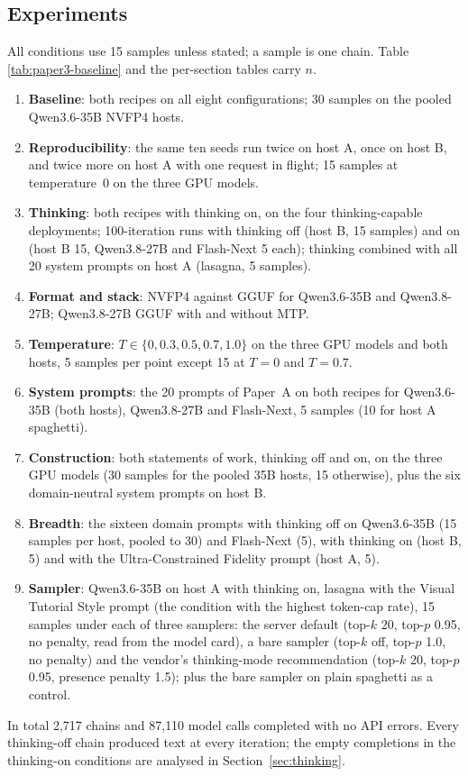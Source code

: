 \documentclass[11pt]{article}
\begin{document}
\subsection{Experiments}
\label{sec:design}

All conditions use 15 samples unless stated; a sample is one chain. Table
\ref{tab:paper3-baseline} and the per-section tables carry $n$.
\begin{enumerate}[leftmargin=*]
  \item \textbf{Baseline}: both recipes on all eight configurations; 30
        samples on the pooled Qwen3.6-35B NVFP4 hosts.
  \item \textbf{Reproducibility}: the same ten seeds run twice on host A,
        once on host B, and twice more on host A with one request in
        flight; 15 samples at temperature~0 on the three GPU models.
  \item \textbf{Thinking}: both recipes with thinking on, on the four
        thinking-capable deployments; 100-iteration runs with thinking off
        (host B, 15 samples) and on (host B 15, Qwen3.8-27B and Flash-Next
        5 each); thinking combined with all 20 system prompts on host A
        (lasagna, 5 samples).
  \item \textbf{Format and stack}: NVFP4 against GGUF for Qwen3.6-35B and
        Qwen3.8-27B; Qwen3.8-27B GGUF with and without MTP.
  \item \textbf{Temperature}: $T\in\{0,0.3,0.5,0.7,1.0\}$ on the three GPU
        models and both hosts, 5 samples per point except 15 at $T=0$ and
        $T=0.7$.
  \item \textbf{System prompts}: the 20 prompts of Paper~A on both recipes
        for Qwen3.6-35B (both hosts), Qwen3.8-27B and Flash-Next, 5 samples
        (10 for host A spaghetti).
  \item \textbf{Construction}: both statements of work, thinking off and on,
        on the three GPU models (30 samples for the pooled 35B hosts, 15
        otherwise), plus the six domain-neutral system prompts on host B.
  \item \textbf{Breadth}: the sixteen domain prompts with thinking off on
        Qwen3.6-35B (15 samples per host, pooled to 30) and Flash-Next (5),
        with thinking on (host B, 5) and with the Ultra-Constrained Fidelity
        prompt (host A, 5).
  \item \textbf{Sampler}: Qwen3.6-35B on host A with thinking on, lasagna with
        the Visual Tutorial Style prompt (the condition with the highest
        token-cap rate), 15 samples under each of three samplers: the server
        default (top-$k$ 20, top-$p$ 0.95, no penalty, read from the model
        card), a bare sampler (top-$k$ off, top-$p$ 1.0, no penalty) and the
        vendor's thinking-mode recommendation (top-$k$ 20, top-$p$ 0.95,
        presence penalty 1.5); plus the bare sampler on plain spaghetti as a
        control.
\end{enumerate}
In total 2{,}717 chains and 87{,}110 model calls completed with no API
errors. Every thinking-off chain produced text at every iteration; the
empty completions in the thinking-on conditions are analysed in
Section~\ref{sec:thinking}.
\end{document}
